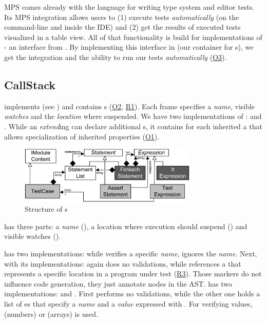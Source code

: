 \ac{MPS} comes already with the language  for writing type
system and editor tests. Its \ac{MPS} integration allows users to (1) execute
tests \emph{automatically} (on the command-line and inside the \ac{IDE}) and 
(2) get the results of
executed tests visualized in a table view. All of that functionality is build
for implementations of  - an interface from . By
implementing this interface in  (our container for
s), we get the  integration and the ability to
run our tests \emph{automatically} (\hyperref[O3]{O3}).



\subsection{CallStack}

 implements  
(see ) and contains
s (\hyperref[O2]{O2}, \hyperref[R1]{R1}). Each frame
specifies a \emph{name}, visible \emph{watches} and the \emph{location} where suspended.
We have two implementations of :
 and .
While an \emph{extend}ing  can declare additional
s, it contains for each inherited
 a  that allows specialization of
inherited properties (\hyperref[O1]{O1}).

\begin{figure}[h]
  \vspace{-2mm}
  \centering
    \includegraphics[width=8.5cm]{./figures/umldiag.png} 
    \vspace{-2mm}
    \caption{Structure of s}
  \label{fig:CallStackStructure}
  \vspace{-2mm}
\end{figure}

 has three parts: a \emph{name} 
(), a location where execution should suspend
() and visible watches ().

 has two implementations: while  verifies
a specific \emph{name},  ignores the \emph{name}.
Next,  with its implementations:
 again does no validations, 
while  references a   that represents a
specific location in a program under test (\hyperref[R3]{R3}). Those markers do
not influence code generation, they just annotate nodes in the \ac{AST}.
 has two implementations:  and .
First performs no validations, while the other one holds a list of es 
that specify a \emph{name} and a \emph{value} expressed with 
. For verifying values,   (\eg numbers)
or  (\eg arrays) is used.


